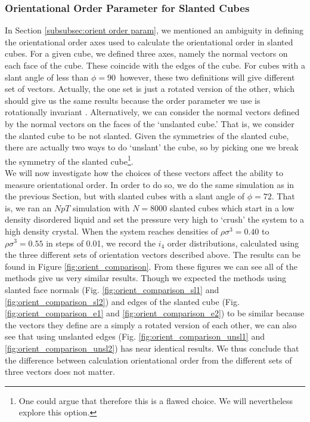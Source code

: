 \documentclass[thesis]{subfiles}
\begin{document}

\subsubsection{Orientational Order Parameter for Slanted Cubes}\label{subsec:orientation vectors}

In Section \ref{subsubsec:orient order param}, we mentioned an ambiguity in defining the orientational order axes used to calculate the orientational order in slanted cubes. For a given cube, we defined three axes, namely the normal vectors on each face of the cube. These coincide with the edges of the cube. For cubes with a slant angle of less than $\phi = 90$\degr\ however, these two definitions will give different set of vectors. Actually, the one set is just a rotated version of the other, which should give us the same results because the order parameter we use is rotationally invariant \cite{steinhardt1983bond}. Alternatively, we can consider the normal vectors defined by the normal vectors on the faces of the `unslanted cube.' That is, we consider the slanted cube to be not slanted. Given the symmetries of the slanted cube, there are actually two ways to do `unslant' the cube, so by picking one we break the symmetry of the slanted cube\footnote{One could argue that therefore this is a flawed choice. We will nevertheless explore this option.}. \\
We will now investigate how the choices of these vectors affect the ability to measure orientational order. In order to do so, we do the same simulation as in the previous Section, but with slanted cubes with a slant angle of $\phi = 72$\degr. That is, we ran an $NpT$ simulation with $N = 8000$ slanted cubes which start in a low density disordered liquid and set the pressure very high to `crush' the system to a high density crystal. When the system reaches densities of $\rho \sigma^3 = 0.40$ to $\rho \sigma^3 = 0.55$ in steps of 0.01, we record the $i_4$ order distributions, calculated using the three different sets of orientation vectors described above. The results can be found in Figure \ref{fig:orient_comparison}.
From these figures we can see all of the methods give us very similar results. Though we expected the methods using slanted face normals (Fig. \ref{fig:orient_comparison_sl1} and \ref{fig:orient_comparison_sl2}) and edges of the slanted cube (Fig. \ref{fig:orient_comparison_e1} and \ref{fig:orient_comparison_e2}) to be similar because the vectors they define are a simply a rotated version of each other, we can also see that using unslanted edges (Fig. \ref{fig:orient_comparison_unsl1} and \ref{fig:orient_comparison_unsl2}) has near identical results. We thus conclude that the difference between calculation orientational order from the different sets of three vectors does not matter.
\end{document}
